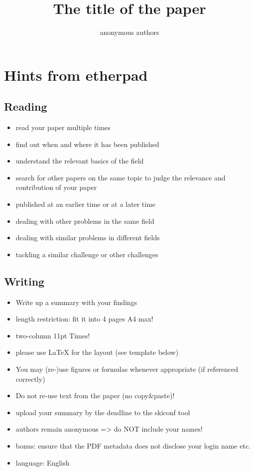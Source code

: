 \documentclass[11pt,twocolumn,a4paper,DIV=calc]{scrartcl}
\begin{document}
\title{The title of the paper}
\author{anonymous authors}
\date{}
\maketitle


\section{Hints from etherpad}
	\subsection{Reading}

	\begin{itemize}
		\item read your paper multiple times
	   \item find out when and where it has been published
	   \item understand the relevant basics of the field
	   \item search for other papers on the same topic to judge the relevance and contribution of your paper
	     \item published at an earlier time or at a later time
	     \item dealing with other problems in the same field
	     \item dealing with similar problems in different fields
	     \item tackling a similar challenge or other challenges
	\end{itemize}

\subsection{Writing}

\begin{itemize}
	\item Write up a summary with your findings
   \item length restriction: fit it into 4 pages A4 max!
   \item two-column 11pt Times!
   \item please use LaTeX for the layout (see template below)

   \item You may (re-)use figures or formulas whenever appropriate (if referenced correctly)
   \item Do not re-use text from the paper (no copy\&paste)!

   \item upload your summary by the deadline to the skiconf tool
     \item authors remain anonymous => do NOT include your names!
     \item bonus: ensure that the PDF metadata does not disclose your login name etc.
   \item language: English
\end{itemize}
\end{document}

